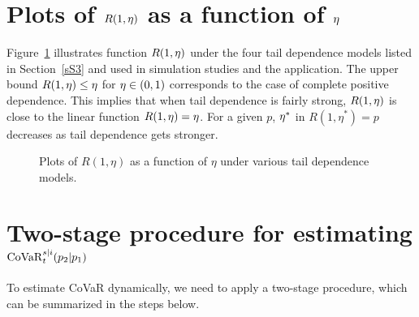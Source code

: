 \section{Plots of \texorpdfstring{$R(1,\eta)$}{R1eta} as a function of \texorpdfstring{$\eta$}{eta}}
\label{sup:tail_fun}

Figure~\ref{tail_fun} illustrates function  $R(1,\eta)$ under the four tail dependence models listed in Section~\ref{sS3} and used in simulation studies and the application. The upper bound $R(1,\eta)\le \eta$ for $\eta\in(0,1)$ corresponds to the case of complete positive dependence. This implies that when tail dependence is fairly strong, $R(1,\eta)$ is close to the linear function $R(1,\eta)=\eta$. For a given $p$, $\eta^*$ in $R(1,\eta^*) = p$ decreases as tail dependence gets stronger. 

\begin{figure}[ht]
  \centering 
    \caption{Plots of $R(1,\eta)$ as a function of $\eta$ under various tail dependence models.}
  \label{tail_fun}
\end{figure}

\clearpage

\section{Two-stage procedure for estimating \texorpdfstring{$\operatorname{CoVaR}_{t}^{s|i}(p_2|p_1)$}{CoVaRt}}\label{sS4}

To estimate CoVaR dynamically, we need to apply a two-stage procedure, which can be summarized in the steps below.

